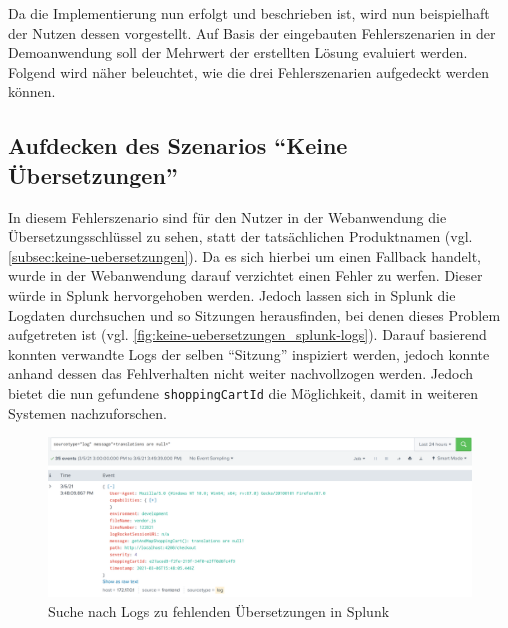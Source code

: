 
Da die Implementierung nun erfolgt und beschrieben ist, wird nun beispielhaft der Nutzen dessen vorgestellt. Auf Basis der eingebauten Fehlerszenarien in der Demoanwendung soll der Mehrwert der erstellten Lösung evaluiert werden. Folgend wird näher beleuchtet, wie die drei Fehlerszenarien aufgedeckt werden können.

\subsection{Aufdecken des Szenarios \enquote{Keine Übersetzungen}}

In diesem Fehlerszenario sind für den Nutzer in der Webanwendung die Übersetzungsschlüssel zu sehen, statt der tatsächlichen Produktnamen (vgl. \autoref{subsec:keine-uebersetzungen}). Da es sich hierbei um einen Fallback handelt, wurde in der Webanwendung darauf verzichtet einen Fehler zu werfen. Dieser würde in Splunk hervorgehoben werden. Jedoch lassen sich in Splunk die Logdaten durchsuchen und so Sitzungen herausfinden, bei denen dieses Problem aufgetreten ist (vgl. \autoref{fig:keine-uebersetzungen_splunk-logs}). Darauf basierend konnten verwandte Logs der selben \enquote{Sitzung} inspiziert werden, jedoch konnte anhand dessen das Fehlverhalten nicht weiter nachvollzogen werden. Jedoch bietet die nun gefundene \texttt{shoppingCartId} die Möglichkeit, damit in weiteren Systemen nachzuforschen.
	
\begin{figure}[H]
	\centering
	\includegraphics[width=1.00\linewidth]{img/05_ergebnis/keine-uebersetzungen_splunk-logs.png}
	\caption{Suche nach Logs zu fehlenden Übersetzungen in Splunk}
	\label{fig:keine-uebersetzungen_splunk-logs}
\end{figure}

